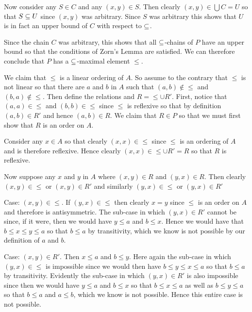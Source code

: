 {{    Now consider any $S \in C$ and any $(x,y) \in S$.
    Then clearly $(x,y) \in \bigcup C = U$ so that $S \ss U$ since $(x,y)$ was arbitrary.
    Since $S$ was arbitrary this shows that $U$ is in fact an upper bound of $C$ with respect to $\ss$.

    Since the chain $C$ was arbitrary, this shows that all $\ss$-chains of $P$ have an upper bound so that the conditions of Zorn's Lemma are satisfied.
    We can therefore conclude that $P$ has a $\ss$-maximal element $\leq$.

    We claim that $\leq$ is a linear ordering of $A$.
    So assume to the contrary that $\leq$ is not linear so that there are $a$ and $b$ in $A$ such that $(a,b) \notin \leq$ and $(b,a) \notin \leq$.
    Then define the relations
    and $R = \leq \cup R'$.
    First, notice that $(a,a) \in \leq$ and $(b,b) \in \leq$ since $\leq$ is reflexive so that by definition $(a,b) \in R'$ and hence $(a,b) \in R$.
    We claim that $R \in P$ so that we must first show that $R$ is an order on $A$.

    Consider any $x \in A$ so that clearly $(x,x) \in \leq$ since $\leq$ is an ordering of $A$ and is therefore reflexive.
    Hence clearly $(x,x) \in \leq \cup R' = R$ so that $R$ is reflexive.

    Now suppose any $x$ and $y$ in $A$ where $(x,y) \in R$ and $(y,x) \in R$.
    Then clearly $(x,y) \in \leq$ or $(x,y) \in R'$ and similarly $(y,x) \in \leq$ or $(y,x) \in R'$

    Case: $(x,y) \in \leq$. If $(y,x) \in \leq$ then clearly $x=y$ since $\leq$ is an order on $A$ and therefore is antisymmetric.
    The sub-case in which $(y,x) \in R'$ cannot be since, if it were, then we would have $y \leq a$ and $b \leq x$.
    Hence we would have that $b \leq x \leq y \leq a$ so that $b \leq a$ by transitivity, which we know is not possible by our definition of $a$ and $b$.

    Case: $(x,y) \in R'$.
    Then $x \leq a$ and $b \leq y$.
    Here again the sub-case in which $(y,x) \in \leq$ is impossible since we would then have $b \leq y \leq x \leq a$ so that $b \leq a$ by transitivity.
    Evidently the sub-case in which $(y,x) \in R'$ is also impossible since then we would have $y \leq a$ and $b \leq x$ so that $b \leq x \leq a$ as well as $b \leq y \leq a$ so that $b \leq a$ and $a \leq b$, which we know is not possible.
    Hence this entire case is not possible.

}}
